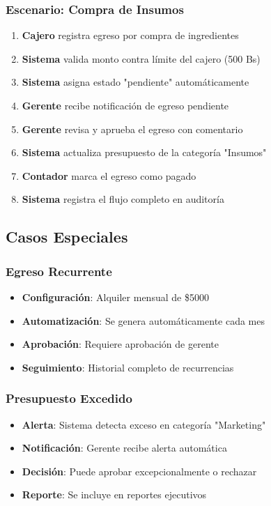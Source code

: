 \documentclass[12pt,a4paper]{article}
\newcommand{\success}[1]{\textcolor{secondarygreen}{\textbf{#1}}}
\newcommand{\warning}[1]{\textcolor{warningorange}{\textbf{#1}}}
\begin{document}
\subsubsection{Escenario: Compra de Insumos}
\begin{enumerate}[leftmargin=*]
    \item \textbf{Cajero} registra egreso por compra de ingredientes
    \item \textbf{Sistema} valida monto contra límite del cajero (500 Bs)
    \item \textbf{Sistema} asigna estado "pendiente" automáticamente
    \item \textbf{Gerente} recibe notificación de egreso pendiente
    \item \textbf{Gerente} revisa y aprueba el egreso con comentario
    \item \textbf{Sistema} actualiza presupuesto de la categoría "Insumos"
    \item \textbf{Contador} marca el egreso como pagado
    \item \textbf{Sistema} registra el flujo completo en auditoría
\end{enumerate}

\subsection{Casos Especiales}

\subsubsection{Egreso Recurrente}
\begin{itemize}[leftmargin=*]
    \item \success{Configuración}: Alquiler mensual de \$5000
    \item \success{Automatización}: Se genera automáticamente cada mes
    \item \success{Aprobación}: Requiere aprobación de gerente
    \item \success{Seguimiento}: Historial completo de recurrencias
\end{itemize}

\subsubsection{Presupuesto Excedido}
\begin{itemize}[leftmargin=*]
    \item \warning{Alerta}: Sistema detecta exceso en categoría "Marketing"
    \item \warning{Notificación}: Gerente recibe alerta automática
    \item \warning{Decisión}: Puede aprobar excepcionalmente o rechazar
    \item \warning{Reporte}: Se incluye en reportes ejecutivos
\end{itemize}
\end{document}
